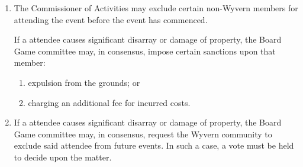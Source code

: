 \begin{enumerate}
    \item The Commissioner of Activities may exclude certain non-Wyvern members for attending the event before the event has commenced.
    
    \begin{item} If a attendee causes significant disarray or damage of property, the Board Game committee may, in consensus, impose certain sanctions upon that member:
        \begin{enumerate}
            \item expulsion from the grounds; or
            \item charging an additional fee for incurred costs.
        \end{enumerate}
    \end{item}
    
    \item If a attendee causes significant disarray or damage of property, the Board Game committee may, in consensus, request the Wyvern community to exclude said attendee from future events. In such a case, a vote must be held to decide upon the matter.

\end{enumerate}
